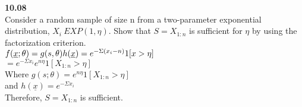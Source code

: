 

{\bf 10.08}\\
Consider a random sample of size n from a two-parameter exponential distribution, $X_i~EXP(1,\eta)$. Show that $S=X_{1:n}$ is sufficient for $\eta$ by using the factorization criterion.
\\$f(\underline{x};\theta)=g(s,\theta)h(\underline{x})\\
=e^{-\Sigma(x_i-n)}1[x>\eta]$\\
$=e^{-\Sigma x_i}e^{n\eta}1[X_{1:n}>\eta]$\\
Where
$g(s;\theta)=e^{n\eta}1[X_{1:n}>\eta]$ \\and 
$h(\underline{x})=e^{-\Sigma x_i}$\\
Therefore, $S=X_{1:n}$ is sufficient.\\
